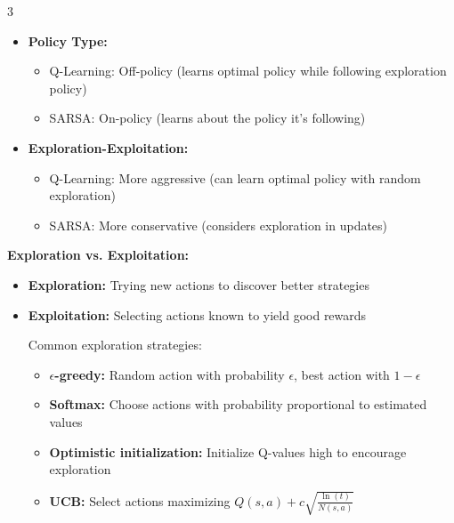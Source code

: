 \documentclass[10pt,landscape]{article}
\begin{document}
\begin{multicols}{3}
\begin{tcolorbox}[breakable, title=Reinforcement Learning, colback=rl, boxsep=1pt, left=1pt, right=1pt, top=1pt, bottom=1pt]
\begin{itemize}[leftmargin=*,noitemsep,topsep=0pt]
    \item \textbf{Policy Type:}
    \begin{itemize}[noitemsep]
        \item Q-Learning: Off-policy (learns optimal policy while following exploration policy)
        \item SARSA: On-policy (learns about the policy it's following)
    \end{itemize}
    
    \item \textbf{Exploration-Exploitation:}
    \begin{itemize}[noitemsep]
        \item Q-Learning: More aggressive (can learn optimal policy with random exploration)
        \item SARSA: More conservative (considers exploration in updates)
    \end{itemize}
\end{itemize}

\textbf{Exploration vs. Exploitation:}
\begin{itemize}[leftmargin=*,noitemsep,topsep=0pt]
    \item \textbf{Exploration:} Trying new actions to discover better strategies
    \item \textbf{Exploitation:} Selecting actions known to yield good rewards
    
    Common exploration strategies:
    \begin{itemize}[noitemsep]
        \item \textbf{$\epsilon$-greedy:} Random action with probability $\epsilon$, best action with $1-\epsilon$
        \item \textbf{Softmax:} Choose actions with probability proportional to estimated values
        \item \textbf{Optimistic initialization:} Initialize Q-values high to encourage exploration
        \item \textbf{UCB:} Select actions maximizing $Q(s,a) + c\sqrt{\frac{\ln(t)}{N(s,a)}}$
    \end{itemize}
\end{itemize}
\end{tcolorbox}


\end{multicols}
\end{document}

